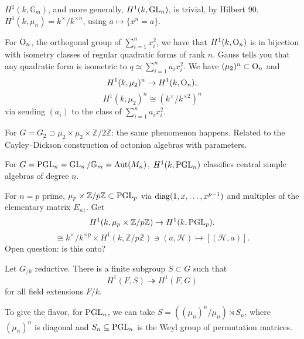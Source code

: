 \documentclass[reqno]{amsart} 
\numberwithin{theorem}{section}
\numberwithin{equation}{section}
\begin{document}
\begin{example}
  $H^1(k, \mathbb{G}_m)$, and more generally, $H^1(k, \operatorname{GL}_n)$, is trivial, by Hilbert 90.  $H^1(k, \mu_n) = k^\times / k^{\times n}$, using $a \mapsto \{x^n = a\}$.
\end{example}
\begin{example}
  For $\operatorname{O}_n$, the orthogonal group of $\sum_{i = 1}^n x_i^2$, we have that $H^1(k, \operatorname{O}_n)$ is in bijection with isometry classes of regular quadratic forms of rank $n$.  Gauss tells you that any quadratic form is isometric to $q \simeq \sum_{i = 1}^n a_i x_i^2$.  We have $(\mu_2)^n \subset \operatorname{O}_n$ and
  \begin{equation*}
    H^1(k, \mu_2)^n \rightarrow H^1(k, \operatorname{O}_n),
  \end{equation*}
  \begin{equation*}
    H^1(k, \mu_2)^n \cong (k^\times / k^{\times 2})^n
  \end{equation*}
  via sending $(a_i)$ to the class of $\sum_{i = 1}^n a_i x_i^2$.
\end{example}
\begin{example}
  For $G = G_2 \supset \mu_2 \times \mu_2 \times \mathbb{Z} / 2 \mathbb{Z}$: the same phenomenon happens.  Related to the Cayley--Dickson construction of octonion algebras with parameters.
\end{example}
\begin{example}
  For $G = \operatorname{PGL}_n = \operatorname{GL}_n / \mathbb{G}_m = \operatorname{Aut}(M_n)$, $H^1(k, \operatorname{PGL}_n)$ classifies central simple algebras of degree $n$.
\end{example}

\begin{example}
  For $n = p$ prime, $\mu_p \times \mathbb{Z} / p \mathbb{Z} \subset \operatorname{PGL}_p$ via $\operatorname{diag}(1, x, \dotsc, x^{p - 1})$ and multiples of the elementary matrix $E_{n 1}$.  Get  
  \begin{equation*}
    H^1(k, \mu_p \times \mathbb{Z} / p \mathbb{Z}) \rightarrow H^1(k, \operatorname{PGL}_p).
  \end{equation*}
  \begin{equation*}
    \cong k^\times / k^{\times p} \times H^1(k, \mathbb{Z} / p \mathbb{Z}) \ni(a, \mathcal{H})
    \mapsto[(\mathcal{H}, a)].
  \end{equation*}
  Open question: is this onto?
\end{example}

\begin{theorem}[CGR, 2006]\label{theorem:cnra0ah0ad}
  Let $G_{/k}$ reductive.  There is a finite subgroup $S \subset G$ such that
  \begin{equation*}
    H^1(F, S) \twoheadrightarrow H^1(F, G)
  \end{equation*}
  for all field extensions $F /k$.
\end{theorem}
To give the flavor, for $\operatorname{PGL}_n$, we can take $S = \left( (\mu_n)^n / \mu_n \right) \rtimes S_n$, where $(\mu_n)^n$ is diagonal and $S_n \subseteq \operatorname{PGL}_n$ is the Weyl group of permutation matrices.
\end{document}

